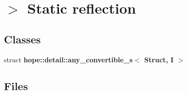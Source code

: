 \hypertarget{group__reflection}{
\section{$>$ Static reflection}
\label{group__reflection}
}
\subsection*{Classes}
\begin{CompactItemize}
\item 
struct \textbf{hope::detail::any\_\-convertible\_\-s$<$ Struct, I $>$}
\end{CompactItemize}
\subsection*{Files}
